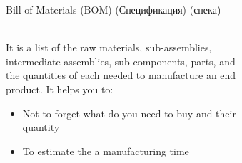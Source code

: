 \documentclass[aspectratio=169]{beamer}
\begin{document}
\begin{frame}[t]{Bill of Materials (BOM) (Спецификация) (спека)}
    \framesubtitle{}
    \vspace{-0.5cm}
    \begin{columns}[T,onlytextwidth]
        \begin{column}{0.37\textwidth}
            It is a list of the raw materials, sub-assemblies, intermediate assemblies, sub-components, parts, and the quantities of each needed to manufacture an end product.
            It helps you to:
            \begin{itemize}
                \item Not to forget what do you need to buy and their quantity
                \item To estimate the a manufacturing time
            \end{itemize}
        \end{column}
        \begin{column}{0.61\textwidth}
            \begin{figure}[H]
                \begin{subfigure}[c]{0.49\textwidth}
                    \centering\includegraphics[height=6cm,width=1\textwidth,keepaspectratio]{bom_2.png}
                    \label{fig:bom_2.png}
                \end{subfigure}
                \begin{subfigure}[c]{0.49\textwidth}
                    \centering\includegraphics[height=6cm,width=1\textwidth,keepaspectratio]{bom_1.png}
                    \label{fig:bom_1.png}
                \end{subfigure}
            \end{figure}
        \end{column}
    \end{columns}
\end{frame}
\end{document}
